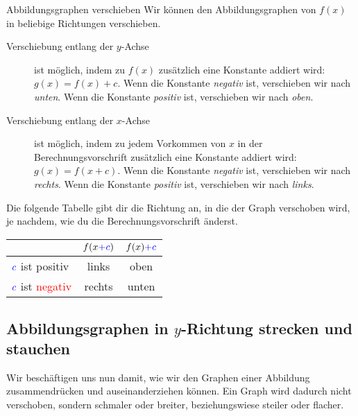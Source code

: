 \documentclass[../../main.tex]{subfiles}
\begin{document}
\begin{nutshell}{Abbildungsgraphen verschieben}
    Wir können den Abbildungsgraphen von $f(x)$ in beliebige Richtungen verschieben.
    \begin{description}
        \item[Verschiebung entlang der $y$-Achse] ist möglich, indem zu $f(x)$ zusätzlich eine Konstante addiert wird: $g(x) = f(x)+c$. Wenn die Konstante \emph{negativ} ist, verschieben wir nach \emph{unten}. Wenn die Konstante \emph{positiv} ist, verschieben wir nach \emph{oben}.
        \item[Verschiebung entlang der $x$-Achse] ist möglich, indem zu jedem Vorkommen von $x$ in der Berechnungsvorschrift zusätzlich eine Konstante addiert wird: $g(x) = f(x+c)$. Wenn die Konstante \emph{negativ} ist, verschieben wir nach \emph{rechts}. Wenn die Konstante \emph{positiv} ist, verschieben wir nach \emph{links}.
    \end{description}
    Die folgende Tabelle gibt dir die Richtung an, in die der Graph verschoben wird, je nachdem, wie du die Berechnungsvorschrift änderst.
    \begin{center}
        \begin{tabular}{l||cc}
             & $f(x\textcolor{blue}{+c})$ & $f(x)\textcolor{blue}{ + c}$\\\hline\hline
            $\color{blue} c$ ist \textcolor{green!50!black}{positiv} & links & oben\\
            $\color{blue} c$ ist \textcolor{red}{negativ} & rechts & unten\\
        \end{tabular}
    \end{center}
\end{nutshell}

\subsection{Abbildungsgraphen in \texorpdfstring{$y$}{y}-Richtung strecken und stauchen}
\label{sec:abbildungen_strecken_y}

Wir beschäftigen uns nun damit, wie wir den Graphen einer Abbildung zusammendrücken und auseinanderziehen können. Ein Graph wird dadurch nicht verschoben, sondern schmaler oder breiter, beziehungswiese steiler oder flacher.
\end{document}
